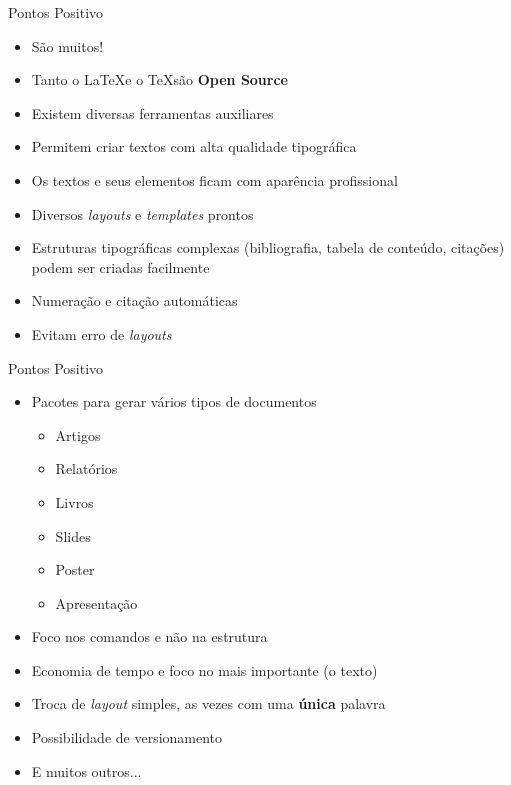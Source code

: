 \begin{frame}{Pontos Positivo}
    \begin{itemize}
        \item São muitos!
        \item Tanto o \LaTeX e o \TeX  são \textbf{Open Source}
        \item Existem diversas ferramentas auxiliares
        \item Permitem criar textos com alta qualidade tipográfica
        \item Os textos e seus elementos ficam com aparência profissional
        \item Diversos \textit{layouts} e \textit{templates} prontos
        \item Estruturas tipográficas complexas (bibliografia, tabela de
        conteúdo, citações) podem ser criadas facilmente
        \item Numeração e citação automáticas
        \item Evitam erro de \textit{layouts}
        
    \end{itemize}
\end{frame}
\begin{frame}{Pontos Positivo}
    \begin{itemize}
        \item Pacotes para gerar vários tipos de documentos
        \begin{itemize}
            \item Artigos
            \item Relatórios
            \item Livros
            \item Slides
            \item Poster
            \item Apresentação
        \end{itemize}
        
        \item Foco nos comandos e não na estrutura
        \item Economia de tempo e foco no mais importante (o texto)
        \item Troca de \textit{layout} simples, as vezes com uma \textbf{única} palavra
        \item Possibilidade de versionamento
        \item E muitos outros...
    \end{itemize}
\end{frame}
